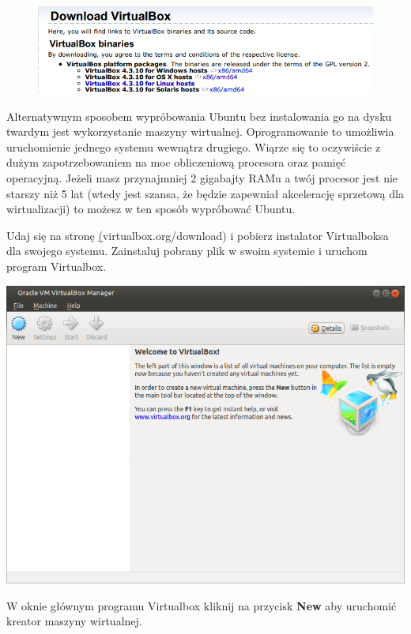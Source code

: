 \begin{figure}
		\includegraphics[width=\linewidth]{images/virtualbox_download.png}
\end{figure}

Alternatywnym sposobem wypróbowania Ubuntu bez instalowania go na dysku twardym jest wykorzystanie maszyny wirtualnej. Oprogramowanie to umożliwia uruchomienie jednego systemu wewnątrz drugiego. Wiąrze się to oczywiście z dużym zapotrzebowaniem na moc obliczeniową procesora oraz pamięć operacyjną. Jeżeli masz przynajmniej 2 gigabajty RAMu a twój procesor jest nie starszy niż 5 lat (wtedy jest szansa, że będzie zapewniał akcelerację sprzetową dla wirtualizacji) to możesz w ten sposób wypróbować Ubuntu.

Udaj się na stronę \href{https://www.virtualbox.org/wiki/Downloads}(virtualbox.org/download) i pobierz instalator Virtualboksa dla swojego systemu. Zainstaluj pobrany plik w swoim systemie i uruchom program Virtualbox.
\clearpage

\begin{center}
	\includegraphics[scale=0.7]{images/virtualbox_main.png}
\end{center}

W oknie głównym programu Virtualbox kliknij na przycisk \textbf{New} aby uruchomić kreator maszyny wirtualnej.
\clearpage

